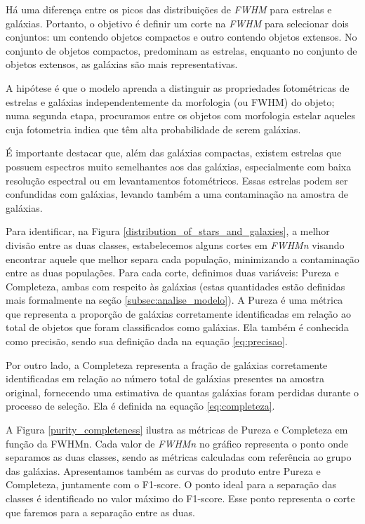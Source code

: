 Há uma diferença entre os picos das distribuições de \textit{FWHM} para estrelas e galáxias. Portanto, o objetivo é definir um corte na \textit{FWHM} para selecionar dois conjuntos: um contendo objetos compactos e outro contendo objetos extensos. No conjunto de objetos compactos, predominam as estrelas, enquanto no conjunto de objetos extensos, as galáxias são mais representativas.

A hipótese é que o modelo aprenda a distinguir as propriedades fotométricas de estrelas e galáxias independentemente da morfologia (ou FWHM) do objeto; numa segunda etapa, procuramos entre os objetos com morfologia estelar aqueles cuja fotometria indica que têm alta probabilidade de serem galáxias.

É importante destacar que, além das galáxias compactas, existem estrelas que possuem espectros muito semelhantes aos das galáxias, especialmente com baixa resolução espectral ou em levantamentos fotométricos. Essas estrelas podem ser confundidas com galáxias, levando também a uma contaminação na amostra de galáxias.

Para identificar, na Figura \ref{distribution_of_stars_and_galaxies}, a melhor divisão entre as duas classes, estabelecemos alguns cortes em \textit{FWHMn} visando encontrar aquele que melhor separa cada população, minimizando a contaminação entre as duas populações. Para cada corte, definimos duas variáveis: Pureza e Completeza, ambas com respeito às galáxias (estas quantidades estão definidas mais formalmente na seção \ref{subsec:analise_modelo}). A Pureza é uma métrica que representa a proporção de galáxias corretamente identificadas em relação ao total de objetos que foram classificados como galáxias. Ela também é conhecida como precisão, sendo sua definição dada na equação \ref{eq:precisao}.

Por outro lado, a Completeza representa a fração de galáxias corretamente identificadas em relação ao número total de galáxias presentes na amostra original, fornecendo uma estimativa de quantas galáxias foram perdidas durante o processo de seleção. Ela é definida na equação \ref{eq:completeza}.

A Figura \ref{purity_completeness} ilustra as métricas de Pureza e Completeza em função da FWHMn. Cada valor de \textit{FWHMn} no gráfico representa o ponto onde separamos as duas classes, sendo as métricas calculadas com referência ao grupo das galáxias. Apresentamos também as curvas do produto entre Pureza e Completeza, juntamente com o F1-score. O ponto ideal para a separação das classes é identificado no valor máximo do F1-score. Esse ponto representa o corte que faremos para a separação entre as duas.

